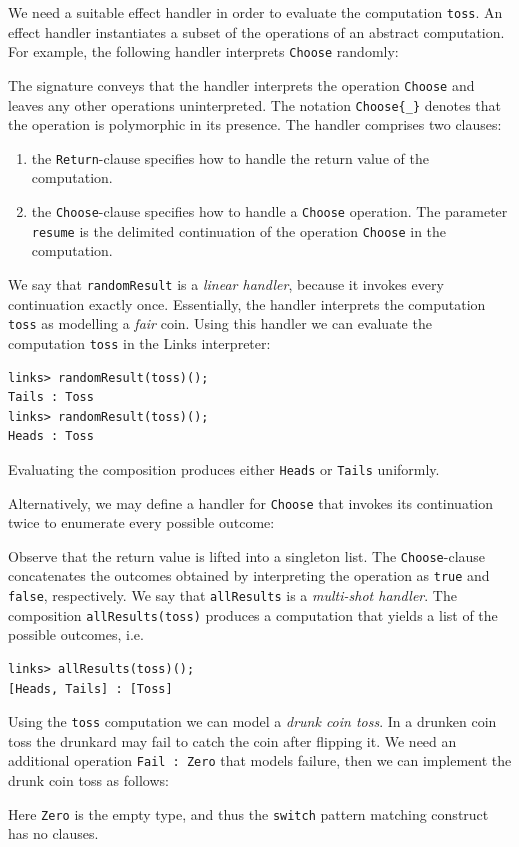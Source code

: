 \documentclass[12pt,mscres,cdtppar,twoside,openright,logo,rightchapter,normalheadings]{infthesis}
\newcommand{\snippet}[1]{}
\theoremstyle{definition}
\begin{document}
We need a suitable effect handler in order to evaluate the computation
\lstinline$toss$. An effect handler instantiates a subset of the
operations of an abstract computation. For example, the following
handler interprets \lstinline$Choose$ randomly:
%
\snippet{randomResult.links}
%
The signature conveys that the handler interprets the operation
\lstinline$Choose$ and leaves any other operations uninterpreted. The
notation \lstinline$Choose{_}$ denotes that the operation is
polymorphic in its presence.  The handler comprises two clauses:
\begin{enumerate}
  \item the \lstinline$Return$-clause specifies how to handle the return
    value of the computation.
  \item the \lstinline$Choose$-clause specifies how to handle a
    \lstinline$Choose$ operation. The parameter \lstinline$resume$ is
    the delimited continuation of the operation \lstinline$Choose$ in
    the computation.
\end{enumerate}
We say that \lstinline$randomResult$ is a \emph{linear handler},
because it invokes every continuation exactly once.  Essentially, the
handler interprets the computation \lstinline$toss$ as modelling a
\emph{fair} coin. Using this handler we can evaluate the computation
\lstinline$toss$ in the Links interpreter:
%
\begin{lstlisting}[style=terminal]
links> randomResult(toss)();
Tails : Toss
links> randomResult(toss)();
Heads : Toss
\end{lstlisting}
%
Evaluating the composition produces either \lstinline$Heads$ or
\lstinline$Tails$ uniformly.

Alternatively, we may define a handler for \lstinline$Choose$ that
invokes its continuation twice to enumerate every possible outcome:
%
\snippet{allResults.links}
%
Observe that the return value is lifted into a singleton list. The
\lstinline$Choose$-clause concatenates the outcomes obtained by
interpreting the operation as \lstinline$true$ and \lstinline$false$,
respectively. We say that \lstinline$allResults$ is a \emph{multi-shot
  handler}. The composition \lstinline$allResults(toss)$ produces a
computation that yields a list of the possible outcomes, i.e.
%
\begin{lstlisting}[style=terminal]
links> allResults(toss)();
[Heads, Tails] : [Toss]
\end{lstlisting}
%

Using the \lstinline$toss$ computation we can model a \emph{drunk coin
  toss}. In a drunken coin toss the drunkard may fail to catch the
coin after flipping it. We need an additional operation
\lstinline$Fail : Zero$ that models failure, then we can implement the
drunk coin toss as follows:
%
\snippet{drunkToss.links}
%
Here \lstinline$Zero$ is the empty type, and thus the
\lstinline$switch$ pattern matching construct has no clauses.
\end{document}
